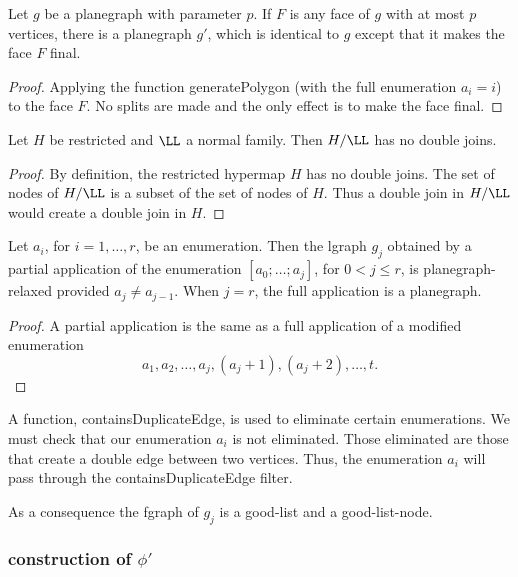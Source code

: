 \begin{lemma}
\begin{lemma}
\begin{lemma}
  Let $g$ be a planegraph with parameter $p$.  If $F$ is any face of
  $g$ with at most $p$ vertices, there is a planegraph $g'$, which is
  identical to $g$ except that it makes the face $F$ final.
\end{lemma} 

\begin{proof}
  Applying the function generatePolygon (with the full enumeration
  $a_i=i$) to the face $F$.  No splits are made and the only effect is
  to make the face final.
\end{proof}

\begin{lemma} Let $H$ be restricted and $\LL$ a normal family.
Then $H/\LL$ has no double joins.
\end{lemma} 

\begin{proof}
By definition, the restricted hypermap $H$  has no double joins.
The set of nodes of $H/\LL$ is a subset of the set of nodes of $H$.
Thus a double join in $H/\LL$ would create a double join in $H$.
\end{proof}


\begin{lemma}  
Let $a_i$, for $i=1,\ldots,r$, be an enumeration.  
Then the lgraph $g_j$ obtained by a partial application of
the enumeration $[a_0;\ldots;a_j]$, for $0<j\le r$, is 
planegraph-relaxed provided $a_j \ne a_{j-1}$.
When $j=r$, the  full application is a planegraph.
\end{lemma} 

\begin{proof} A partial application is the same as a full application
of a modified enumeration
\[
a_1,a_2,\ldots,a_j,(a_j+1),(a_j+2),\ldots,t.
\]
\end{proof}

\begin{remark}
A function, containsDuplicateEdge, is used to eliminate certain
enumerations.  We must check that our enumeration $a_i$ is not
eliminated.  Those eliminated are those that create a double edge
between two vertices.  Thus, the enumeration $a_i$ will pass through
the containsDuplicateEdge filter.
\end{remark}

As a consequence the fgraph of $g_j$ is a good-list and a
good-list-node.

\subsubsection{construction of $\phi'$}


\end{lemma}
\end{lemma}
